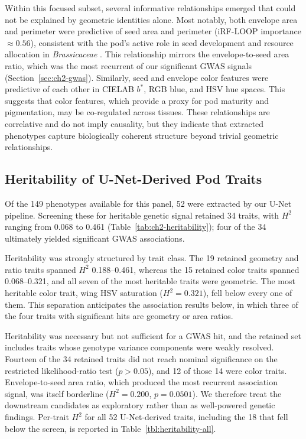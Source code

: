 Within this focused subset, several informative relationships emerged that could not be explained by geometric identities alone. Most notably, both envelope area and perimeter were predictive of seed area and perimeter (iRF-LOOP importance $\approx 0.56$), consistent with the pod's active role in seed development and resource allocation in \textit{Brassicaceae} \cite{wing-seed-assoc}. This relationship mirrors the envelope-to-seed area ratio, which was the most recurrent of our significant GWAS signals (Section~\ref{sec:ch2-gwas}). Similarly, seed and envelope color features were predictive of each other in CIELAB $b^*$, RGB blue, and HSV hue spaces. This suggests that color features, which provide a proxy for pod maturity and pigmentation, may be co-regulated across tissues. These relationships are correlative and do not imply causality, but they indicate that extracted phenotypes capture biologically coherent structure beyond trivial geometric relationships.

\subsection{Heritability of U-Net-Derived Pod Traits}
Of the 149 phenotypes available for this panel, 52 were extracted by our U-Net pipeline. Screening these for heritable genetic signal retained 34 traits, with $H^2$ ranging from 0.068 to 0.461 (Table~\ref{tab:ch2-heritability}); four of the 34 ultimately yielded significant GWAS associations.

Heritability was strongly structured by trait class. The 19 retained geometry and ratio traits spanned $H^2$ 0.188--0.461, whereas the 15 retained color traits spanned 0.068--0.321, and all seven of the most heritable traits were geometric. The most heritable color trait, wing HSV saturation ($H^2 = 0.321$), fell below every one of them. This separation anticipates the association results below, in which three of the four traits with significant hits are geometry or area ratios.

Heritability was necessary but not sufficient for a GWAS hit, and the retained set includes traits whose genotype variance components were weakly resolved. Fourteen of the 34 retained traits did not reach nominal significance on the restricted likelihood-ratio test ($p > 0.05$), and 12 of those 14 were color traits. Envelope-to-seed area ratio, which produced the most recurrent association signal, was itself borderline ($H^2 = 0.200$, $p = 0.0501$). We therefore treat the downstream candidates as exploratory rather than as well-powered genetic findings. Per-trait $H^2$ for all 52 U-Net-derived traits, including the 18 that fell below the screen, is reported in Table~\ref{tbl:heritability-all}.

